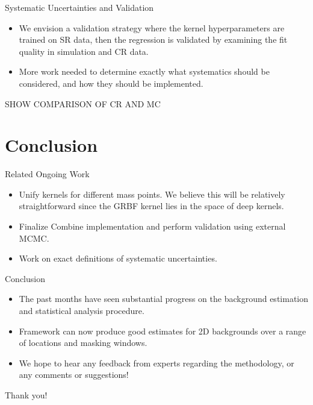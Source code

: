 \documentclass[10pt]{beamer}
\begin{document}
\begin{frame}{Systematic Uncertainties and Validation}
  \begin{itemize}
  \item We envision a validation strategy where the kernel hyperparameters are trained on SR data, then the regression is validated by examining the fit quality in simulation and CR data.
  \item More work needed to determine exactly what systematics should be considered, and how they should be implemented.
  \end{itemize}


  SHOW COMPARISON OF CR AND MC 
\end{frame}


\section{Conclusion}
\label{sec:conclusion}

\begin{frame}{Related Ongoing Work}
  \begin{itemize}
  \item Unify kernels for different mass points. We believe this will be relatively straightforward since the GRBF kernel lies in the space of deep kernels. 
  \item Finalize Combine implementation and perform validation using external MCMC.
  \item Work on exact definitions of systematic uncertainties.
  \end{itemize}
  
\end{frame}

\begin{frame}{Conclusion}
  \begin{itemize}
  \item The past months have seen substantial progress on the background estimation and statistical analysis procedure.
  \item Framework can now produce good estimates for 2D backgrounds over a range of locations and masking windows.
  \item We hope to hear any feedback from experts regarding the methodology, or any comments or suggestions!
  \end{itemize}
  \vspace{1cm}

  \begin{center}
    {\Large Thank you!}
  \end{center}
\end{frame}
\end{document}

